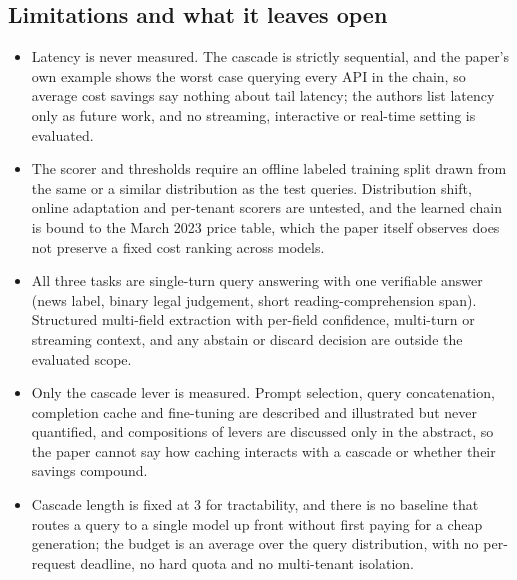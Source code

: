 \subsection{Limitations and what it leaves open}
\begin{itemize}[leftmargin=*, itemsep=2pt, topsep=2pt]
  \item Latency is never measured. The cascade is strictly sequential, and the paper's own example shows the worst case querying every API in the chain, so average cost savings say nothing about tail latency; the authors list latency only as future work, and no streaming, interactive or real-time setting is evaluated.
  \item The scorer and thresholds require an offline labeled training split drawn from the same or a similar distribution as the test queries. Distribution shift, online adaptation and per-tenant scorers are untested, and the learned chain is bound to the March 2023 price table, which the paper itself observes does not preserve a fixed cost ranking across models.
  \item All three tasks are single-turn query answering with one verifiable answer (news label, binary legal judgement, short reading-comprehension span). Structured multi-field extraction with per-field confidence, multi-turn or streaming context, and any abstain or discard decision are outside the evaluated scope.
  \item Only the cascade lever is measured. Prompt selection, query concatenation, completion cache and fine-tuning are described and illustrated but never quantified, and compositions of levers are discussed only in the abstract, so the paper cannot say how caching interacts with a cascade or whether their savings compound.
  \item Cascade length is fixed at 3 for tractability, and there is no baseline that routes a query to a single model up front without first paying for a cheap generation; the budget is an average over the query distribution, with no per-request deadline, no hard quota and no multi-tenant isolation.
\end{itemize}
